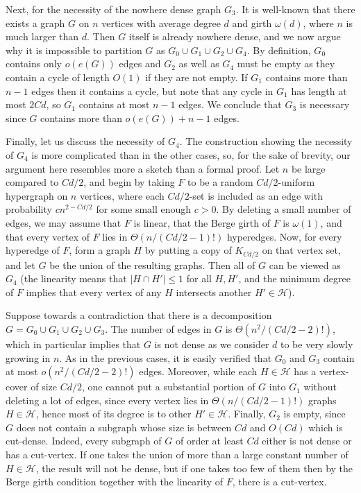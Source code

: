 \documentclass[10pt]{article}
\theoremstyle{definition}
\newcommand\ab[1]{\lvert#1\rvert}
\let\leq\leqslant
\begin{document}
Next, for the necessity of the nowhere dense graph $G_3$. It is well-known that there exists a graph $G$ on $n$ vertices with average degree $d$ and girth $\omega(d)$, where $n$ is much larger than $d$. Then $G$ itself is already nowhere dense, and we now argue why it is impossible to partition $G$ as $G_0 \cup G_1 \cup G_2 \cup G_4$. By definition, $G_0$ contains only $o(e(G))$ edges and $G_2$ as well as $G_4$ must be empty as they contain a cycle of length $O(1)$ if they are not empty. If $G_1$ contains more than $n-1$ edges then it contains a cycle, but note that any cycle in $G_1$ has length at most $2Cd$, so $G_1$ contains at most $n-1$ edges. We conclude that $G_3$ is necessary since $G$ contains more than $o(e(G))+n-1$ edges.



Finally, let us discuss the necessity of $G_4$. The construction showing the necessity of $G_4$ is more complicated than in the other cases, so, for the sake of brevity, our argument here resembles more a sketch than a formal proof. Let $n$ be large compared to $Cd/2$, and begin by taking $F$ to be a random $Cd/2$-uniform hypergraph on $n$ vertices, where each $Cd/2$-set is included as an edge with probability $cn^{2-Cd/2}$ for some small enough $c>0$. By deleting a small number of edges, we may assume that $F$ is linear, that the Berge girth of $F$ is $\omega(1)$, and that every vertex of $F$ lies in $\Theta(n/(Cd/2-1)!)$ hyperedges. Now, for every hyperedge of $F$, form a graph $H$ by putting a copy of $K_{Cd/2}$ on that vertex set, and let $G$ be the union of the resulting graphs. Then all of $G$ can be viewed as $G_4$ (the linearity means that $\ab{H \cap H'}\leq 1$ for all $H,H'$, and the minimum degree of $F$ implies that every vertex of any $H$ intersects another $H'\in \mathcal H$).

Suppose towards a contradiction that there is a decomposition $G=G_0\cup G_1\cup G_2\cup G_3$. The number of edges in $G$ is $\Theta(n^2/(Cd/2-2)!)$, which in particular implies that $G$ is not dense as we consider $d$ to be very slowly growing in $n$. As in the previous cases, it is easily verified that $G_0$ and $G_3$ contain at most $o(n^{2}/(Cd/2-2)!)$ edges. Moreover, while each $H \in \mathcal H$ has a vertex-cover of size $Cd/2$, one cannot put a substantial portion of $G$ into $G_1$ without deleting a lot of edges, since every vertex lies in $\Theta(n/(Cd/2-1)!)$ graphs $H \in \mathcal H$, hence most of its degree is to other $H'\in\mathcal H$. Finally, $G_2$ is empty, since $G$ does not contain a subgraph whose size is between $Cd$ and $O(Cd)$ which is cut-dense. Indeed, every subgraph of $G$ of order at least $Cd$ either is not dense or has a cut-vertex. If one takes the union of more than a large constant number of $H \in \mathcal H$, the result will not be dense, but if one takes too few of them then by the Berge girth condition together with the linearity of $F$, there is a cut-vertex.
\end{document}
